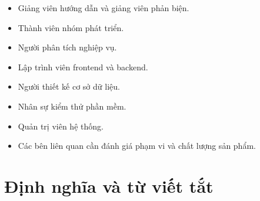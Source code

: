 \begin{itemize}
    \item Giảng viên hướng dẫn và giảng viên phản biện.
    \item Thành viên nhóm phát triển.
    \item Người phân tích nghiệp vụ.
    \item Lập trình viên frontend và backend.
    \item Người thiết kế cơ sở dữ liệu.
    \item Nhân sự kiểm thử phần mềm.
    \item Quản trị viên hệ thống.
    \item Các bên liên quan cần đánh giá phạm vi và chất lượng sản phẩm.
\end{itemize}

\section{Định nghĩa và từ viết tắt}
\label{sec:definitions-acronyms}

